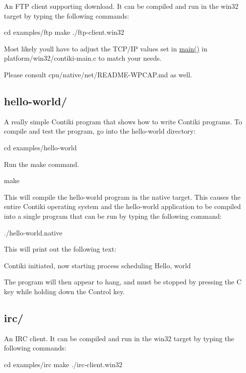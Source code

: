 An F\+T\+P client supporting download. It can be compiled and run in the \textquotesingle{}win32\textquotesingle{} target by typing the following commands\+: \begin{DoxyVerb}cd examples/ftp
make
./ftp-client.win32
\end{DoxyVerb}


Most likely you\textquotesingle{}ll have to adjust the T\+C\+P/\+I\+P values set in \hyperlink{group__IPV6_ga0c99d968a34e803d378692bde2e3f18f}{main()} in platform/win32/contiki-\/main.\+c to match your needs.

Please consult cpu/native/net/\+R\+E\+A\+D\+M\+E-\/\+W\+P\+C\+A\+P.\+md as well.

\subsection*{hello-\/world/ }

A really simple Contiki program that shows how to write Contiki programs. To compile and test the program, go into the hello-\/world directory\+: \begin{DoxyVerb}cd examples/hello-world
\end{DoxyVerb}


Run the \textquotesingle{}make\textquotesingle{} command. \begin{DoxyVerb}make
\end{DoxyVerb}


This will compile the hello-\/world program in the \textquotesingle{}native\textquotesingle{} target. This causes the entire Contiki operating system and the hello-\/world application to be compiled into a single program that can be run by typing the following command\+: \begin{DoxyVerb}./hello-world.native
\end{DoxyVerb}


This will print out the following text\+: \begin{DoxyVerb}Contiki initiated, now starting process scheduling
Hello, world
\end{DoxyVerb}


The program will then appear to hang, and must be stopped by pressing the C key while holding down the Control key.

\subsection*{irc/ }

An I\+R\+C client. It can be compiled and run in the \textquotesingle{}win32\textquotesingle{} target by typing the following commands\+: \begin{DoxyVerb}cd examples/irc
make
./irc-client.win32
\end{DoxyVerb}


